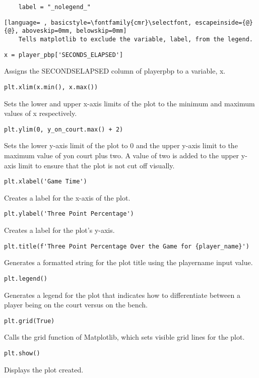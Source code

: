 \documentclass{article}
\begin{document}
\begin{lstlisting}
    label = "_nolegend_"
\end{lstlisting}
\begin{lstlisting}[language= , basicstyle=\fontfamily{cmr}\selectfont, escapeinside={@}{@}, aboveskip=0mm, belowskip=0mm]
    Tells matplotlib to exclude the variable, label, from the legend.
\end{lstlisting}
\begin{lstlisting}
x = player_pbp['SECONDS_ELAPSED']
\end{lstlisting}
Assigns the SECONDS\textunderscore ELAPSED column of player\textunderscore pbp to a variable, x.
\begin{lstlisting}
plt.xlim(x.min(), x.max())
\end{lstlisting}
Sets the lower and upper x-axis limits of the plot to the minimum and maximum values of x respectively.
\begin{lstlisting}
plt.ylim(0, y_on_court.max() + 2)
\end{lstlisting}
Sets the lower y-axis limit of the plot to 0 and the upper y-axis limit to the maximum value of y\textunderscore on \textunderscore court plus two. A value of two is added to the upper y-axis limit to ensure that the plot is not cut off visually.
\begin{lstlisting}
plt.xlabel('Game Time')
\end{lstlisting}
Creates a label for the x-axis of the plot.
\begin{lstlisting}
plt.ylabel('Three Point Percentage')
\end{lstlisting}
Creates a label for the plot's y-axis.
\begin{lstlisting}
plt.title(f'Three Point Percentage Over the Game for {player_name}')
\end{lstlisting}
Generates a formatted string for the plot title using the player\textunderscore name input value.
\begin{lstlisting}
plt.legend()
\end{lstlisting}
Generates a legend for the plot that indicates how to differentiate between a player being on the court versus on the bench.
\begin{lstlisting}
plt.grid(True)
\end{lstlisting}
Calls the grid function of Matplotlib, which sets visible grid lines for the plot.
\begin{lstlisting}
plt.show()
\end{lstlisting}
Displays the plot created.
\end{document}
